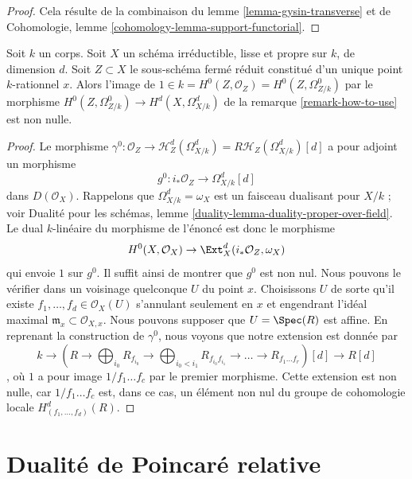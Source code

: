 \begin{proof}
Cela résulte de la combinaison du lemme \ref{lemma-gysin-transverse}
et de Cohomologie, lemme \ref{cohomology-lemma-support-functorial}.
\end{proof}

\begin{lemma}
\label{lemma-class-of-a-point}
Soit $k$ un corps. Soit $X$ un schéma irréductible, lisse et propre sur $k$,
de dimension $d$. Soit $Z \subset X$ le sous-schéma fermé réduit constitué
d'un unique point $k$-rationnel $x$. Alors l'image de
$1 \in k = H^0(Z, \mathcal{O}_Z) = H^0(Z, \Omega^0_{Z/k})$
par le morphisme $H^0(Z, \Omega^0_{Z/k}) \to H^d(X, \Omega^d_{X/k})$
de la remarque \ref{remark-how-to-use} est non nulle.
\end{lemma}

\begin{proof}
Le morphisme $\gamma^0 : \mathcal{O}_Z \to
\mathcal{H}^d_Z(\Omega^d_{X/k}) = R\mathcal{H}_Z(\Omega^d_{X/k})[d]$
a pour adjoint un morphisme
$$
g^0 : i_*\mathcal{O}_Z \longrightarrow \Omega^d_{X/k}[d]
$$
dans $D(\mathcal{O}_X)$. Rappelons que $\Omega^d_{X/k} = \omega_X$ est un
faisceau dualisant pour $X/k$ ; voir
Dualité pour les schémas, lemme \ref{duality-lemma-duality-proper-over-field}.
Le dual $k$-linéaire du morphisme de l'énoncé
est donc le morphisme
$$
H^0(X, \mathcal{O}_X) \to \Ext^d_X(i_*\mathcal{O}_Z, \omega_X)
$$
qui envoie $1$ sur $g^0$. Il suffit ainsi de montrer que $g^0$ est non nul.
Nous pouvons le vérifier dans un voisinage quelconque $U$ du point $x$. Choisissons $U$
de sorte qu'il existe $f_1, \ldots, f_d \in \mathcal{O}_X(U)$
s'annulant seulement en $x$ et engendrant l'idéal maximal
$\mathfrak m_x \subset \mathcal{O}_{X, x}$. Nous pouvons supposer
que $U = \Spec(R)$ est affine. En reprenant la
construction de $\gamma^0$, nous voyons que notre extension est donnée par
$$
k \to
(R \to \bigoplus\nolimits_{i_0} R_{f_{i_0}} \to
\bigoplus\nolimits_{i_0 < i_1} R_{f_{i_0}f_{i_1}} \to
\ldots \to R_{f_1\ldots f_r})[d] \to R[d]
$$,
où $1$ a pour image $1/f_1 \ldots f_c$ par le premier morphisme.
Cette extension est non nulle, car $1/f_1 \ldots f_c$ est, dans ce cas, un élément non nul
du groupe de cohomologie locale $H^d_{(f_1, \ldots, f_d)}(R)$.
\end{proof}






\section{Dualité de Poincaré relative}
\label{section-relative-poincare-duality}

